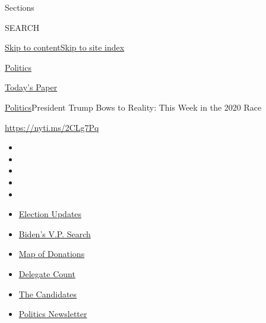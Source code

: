 Sections

SEARCH

\protect\hyperlink{site-content}{Skip to
content}\protect\hyperlink{site-index}{Skip to site index}

\href{https://www.nytimes.com/section/politics}{Politics}

\href{https://myaccount.nytimes.com/auth/login?response_type=cookie\&client_id=vi}{}

\href{https://www.nytimes.com/section/todayspaper}{Today's Paper}

\href{/section/politics}{Politics}\textbar{}President Trump Bows to
Reality: This Week in the 2020 Race

\url{https://nyti.ms/2CLg7Pq}

\begin{itemize}
\item
\item
\item
\item
\item
\end{itemize}

\begin{itemize}
\item
  \href{https://www.nytimes.com/2020/07/31/us/elections/biden-vs-trump.html?action=click\&pgtype=Article\&state=default\&region=TOP_BANNER\&context=storylines_menu}{Election
  Updates}
\item
  \href{https://www.nytimes.com/article/biden-vice-president-2020.html?action=click\&pgtype=Article\&state=default\&region=TOP_BANNER\&context=storylines_menu}{Biden's
  V.P. Search}
\item
  \href{https://www.nytimes.com/interactive/2020/07/24/us/politics/trump-biden-campaign-donors.html?action=click\&pgtype=Article\&state=default\&region=TOP_BANNER\&context=storylines_menu}{Map
  of Donations}
\item
  \href{https://www.nytimes.com/interactive/2020/us/elections/delegate-count-primary-results.html?action=click\&pgtype=Article\&state=default\&region=TOP_BANNER\&context=storylines_menu}{Delegate
  Count}
\item
  \href{https://www.nytimes.com/interactive/2019/us/politics/2020-presidential-candidates.html?action=click\&pgtype=Article\&state=default\&region=TOP_BANNER\&context=storylines_menu}{The
  Candidates}
\item
  \href{https://www.nytimes.com/newsletters/politics?action=click\&pgtype=Article\&state=default\&region=TOP_BANNER\&context=storylines_menu}{Politics
  Newsletter}
\end{itemize}

